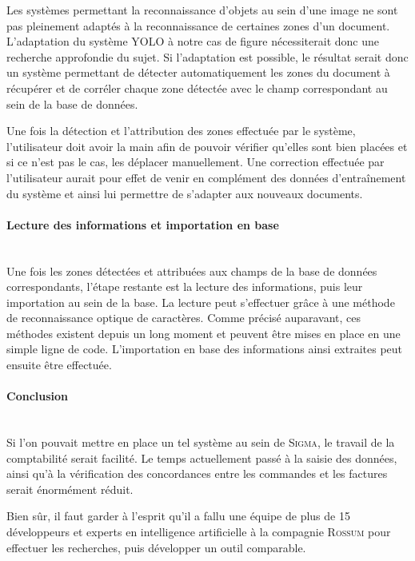 Les systèmes permettant la reconnaissance d'objets au sein d'une image ne sont pas pleinement adaptés à la reconnaissance de certaines zones d'un document.
L'adaptation du système YOLO à notre cas de figure nécessiterait donc une recherche approfondie du sujet.
Si l'adaptation est possible, le résultat serait donc un système permettant de détecter automatiquement  les zones du document à récupérer et de corréler chaque zone détectée avec le champ correspondant au sein de la base de données.

Une fois la détection et l'attribution des zones effectuée par le système, l'utilisateur doit avoir la main afin de pouvoir vérifier qu'elles sont bien placées et si ce n'est pas le cas, les déplacer manuellement.
Une correction effectuée par l'utilisateur aurait pour effet de venir en complément des données d'entraînement du système et ainsi lui permettre de s'adapter aux nouveaux documents.

\paragraph*{Lecture des informations et importation en base}
~\\

Une fois les zones détectées et attribuées aux champs de la base de données correspondants, l'étape restante est la lecture des informations, puis leur importation au sein de la base.
La lecture peut s'effectuer grâce à une méthode de reconnaissance optique de caractères.
Comme précisé auparavant, ces méthodes existent depuis un long moment et peuvent être mises en place en une simple ligne de code.
L'importation en base des informations ainsi extraites peut ensuite être effectuée.

\paragraph*{Conclusion}
~\\

Si l'on pouvait mettre en place un tel système au sein de \textsc{Sigma}, le travail de la comptabilité serait facilité.
Le temps actuellement passé à la saisie des données, ainsi qu'à la vérification des concordances entre les commandes et les factures serait énormément réduit.

Bien sûr, il faut garder à l'esprit qu'il a fallu une équipe de plus de 15 développeurs et experts en intelligence artificielle à la compagnie \textsc{Rossum} pour effectuer les recherches, puis développer un outil comparable.